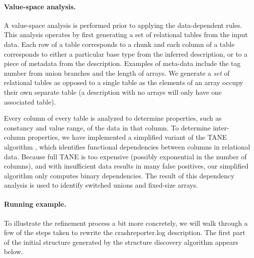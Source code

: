 \paragraph*{Value-space analysis.}
A value-space analysis is performed prior
to applying the data-dependent rules.
This analysis operates by first generating a set of relational tables
from the input data.
Each row of a table corresponds to a chunk and each column of a table
corresponds to either a particular base type from the inferred description,
or to a piece of metadata from the description.  Examples of meta-data
include the tag number from union branches and the length of arrays.
We generate a {\em set} of relational tables as opposed to a single table
as the elements of an array occupy their own separate table (a description 
with no arrays will only have one associated table).
 
Every column of every table is analyzed to determine properties,
such as constancy and value range, of the data in that column.
To determine inter-column properties, we have implemented a simplified
variant of the TANE algorithm \cite{TANE-HKPT99},
which identifies functional dependencies between columns in 
relational data.  Because full TANE is too expensive 
(possibly exponential in the number of columns), 
and with insufficient data results in many false positives, 
our simplified algorithm only computes binary dependencies. The 
result of this dependency analysis is used to 
identify switched unions and fixed-size arrays.

\paragraph*{Running example.}
To illustrate the refinement process a bit more concretely, 
we will walk through a few of the steps taken to rewrite the
crashreporter.log description.  The first part of the
initial structure generated by the structure discovery algorithm
appears below.

